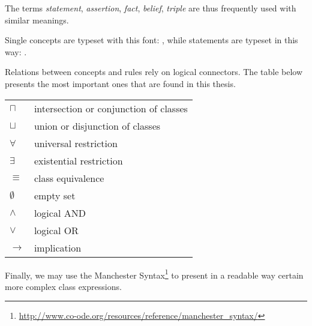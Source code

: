 The terms \emph{statement}, \emph{assertion}, \emph{fact}, \emph{belief},
\emph{triple} are thus frequently used with similar meanings.

Single concepts are typeset with this font: , while statements
are typeset in this way: .

Relations between concepts and rules rely on logical connectors. The table
below presents the most important ones that are found in this thesis.

\begin{center}
\begin{tabular}{ll}
\toprule
$\sqcap$ & intersection or conjunction of classes \\
$\sqcup$ & union or disjunction of classes \\
$\forall$ & universal restriction \\
$\exists$ & existential restriction \\
$\equiv$ & class equivalence \\
$\emptyset$ & empty set \\
\midrule
$\land$ & logical AND \\
$\lor$ & logical OR \\
$\to$ & implication \\
\bottomrule
\end{tabular}
\end{center}

Finally, we may use the Manchester
Syntax\footnote{\url{http://www.co-ode.org/resources/reference/manchester_syntax/}}
to present in a readable way certain more complex class expressions.

\clearpage
